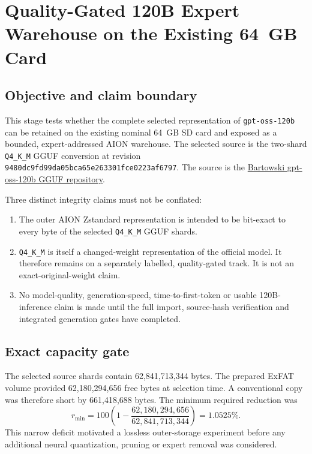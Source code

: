 \section{Quality-Gated 120B Expert Warehouse on the Existing 64~GB Card}
\label{sec:gpt-oss-120b-expert-warehouse-progress}
\begingroup
\sloppy

\subsection{Objective and claim boundary}

This stage tests whether the complete selected representation of
\texttt{gpt-oss-120b} can be retained on the existing nominal 64~GB SD card
and exposed as a bounded, expert-addressed AION warehouse.  The selected
source is the two-shard \texttt{Q4\_K\_M} GGUF conversion at revision
\texttt{9480dc9fd99da05bca65e263301fce0223af6797}.  The source is the
\href{https://huggingface.co/bartowski/openai_gpt-oss-120b-GGUF}%
{Bartowski gpt-oss-120b GGUF repository}.

Three distinct integrity claims must not be conflated:
\begin{enumerate}
  \item The outer AION Zstandard representation is intended to be bit-exact
        to every byte of the selected \texttt{Q4\_K\_M} GGUF shards.
  \item \texttt{Q4\_K\_M} is itself a changed-weight representation of the
        official model.  It therefore remains on a separately labelled,
        quality-gated track.  It is not an exact-original-weight claim.
  \item No model-quality, generation-speed, time-to-first-token or usable
        120B-inference claim is made until the full import, source-hash
        verification and integrated generation gates have completed.
\end{enumerate}

\subsection{Exact capacity gate}

The selected source shards contain 62,841,713,344 bytes.  The prepared ExFAT
volume provided 62,180,294,656 free bytes at selection time.  A conventional
copy was therefore short by 661,418,688 bytes.  The minimum required reduction
was
\begin{equation}
 r_{\min} = 100\left(1-\frac{62{,}180{,}294{,}656}
 {62{,}841{,}713{,}344}\right) = 1.0525\%.
\end{equation}
This narrow deficit motivated a lossless outer-storage experiment before any
additional neural quantization, pruning or expert removal was considered.

